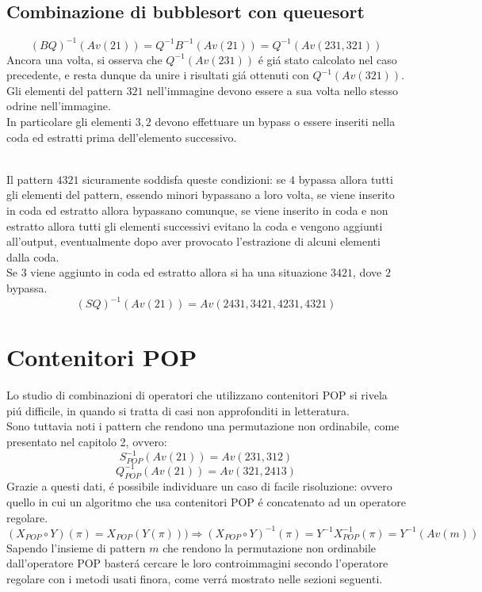\subsection*{Combinazione di {bubblesort} con {queuesort}}
$$(BQ)^{-1}(Av(21))=Q^{-1}B^{-1}(Av(21))=Q^{-1}(Av(231,321))$$
Ancora una volta, si osserva che $Q^{-1}(Av(231))$ \'e gi\'a stato calcolato nel caso precedente, e resta dunque da unire i risultati gi\'a ottenuti con $Q^{-1}(Av(321))$.\\
Gli elementi del pattern $321$ nell'immagine devono essere a sua volta nello stesso odrine nell'immagine.\\
In particolare gli elementi $3,2$ devono effettuare un bypass o essere inseriti nella coda ed estratti prima dell'elemento successivo.\\\\
\begin{center}
\end{center}
Il pattern $4321$ sicuramente soddisfa queste condizioni: se $4$ bypassa allora tutti gli elementi del pattern, essendo minori bypassano a loro volta, se viene inserito in coda ed estratto allora bypassano comunque, se viene inserito in coda e non estratto allora tutti gli elementi successivi evitano la coda e vengono aggiunti all'output, eventualmente dopo aver provocato l'estrazione di alcuni elementi dalla coda.\\
Se $3$ viene aggiunto in coda ed estratto allora si ha una situazione $3421$, dove $2$ bypassa.\\
$$(SQ)^{-1}(Av(21))=Av(2431,3421,4231,4321)$$
\section*{Contenitori POP}
Lo studio di combinazioni di operatori che utilizzano contenitori POP si rivela pi\'u difficile, in quando si tratta di casi non approfonditi in letteratura.\\
Sono tuttavia noti i pattern che rendono una permutazione non ordinabile, come presentato nel capitolo 2, ovvero:
$$S_{POP}^{-1}(Av(21)) = Av(231,312)$$$$Q_{POP}^{-1}(Av(21))=Av(321,2413)$$
Grazie a questi dati, \'e possibile individuare un caso di facile risoluzione: ovvero quello in cui un algoritmo che usa contenitori POP \'e concatenato ad un operatore regolare.
$$(X_{POP}\circ{Y})(\pi)= X_{POP}(Y(\pi)))\Rightarrow(X_{POP}\circ{Y})^{-1}(\pi) = Y^{-1}X_{POP}^{-1}(\pi)=Y^{-1}(Av(m))$$
Sapendo l'insieme di pattern $m$ che rendono la permutazione non ordinabile dall'operatore POP baster\'a cercare le loro controimmagini secondo l'operatore regolare con i metodi usati finora, come verr\'a mostrato nelle sezioni seguenti.
